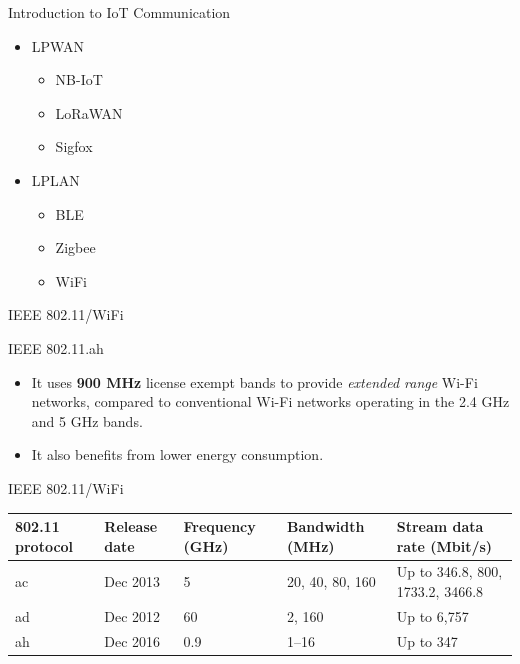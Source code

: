 \documentclass[serif,Blue]{beamer}
\begin{document}
\begin{frame}{Introduction to IoT Communication}
	\begin{itemize}
		\item LPWAN
			\begin{itemize}
				\item NB-IoT
				\item LoRaWAN
				\item Sigfox
			\end{itemize}
		\item LPLAN
			\begin{itemize}
				\item BLE
				\item Zigbee
				\item WiFi
			\end{itemize}
	\end{itemize}
\end{frame}

\begin{frame}{IEEE 802.11/WiFi}
	\begin{block}{IEEE 802.11.ah}
		\begin{itemize}
			\item It uses \textbf{900 MHz} license exempt bands to provide \emph{extended range} Wi-Fi networks, compared to conventional Wi-Fi networks operating in the 2.4 GHz and 5 GHz bands.
			\item It also benefits from lower energy consumption.
		\end{itemize}
	\end{block}
\end{frame}

\begin{frame}{IEEE 802.11/WiFi}
	\begin{tabular}{p{1cm} p{1cm} p{1.5cm} p{1.5cm} p{2cm}}
		\toprule
		802.11 protocol & Release date & Frequency (GHz) & Bandwidth (MHz) & Stream data rate (Mbit/s) \\
		\midrule
		ac & Dec 2013 & 5 & 20, 40, 80, 160 & Up to 346.8, 800, 1733.2, 3466.8\\
		ad & Dec 2012 & 60 & 2, 160 & Up to 6,757\\
		ah & Dec 2016 & 0.9 & 1--16 & Up to 347\\
		\bottomrule
	\end{tabular}
\end{frame}
\end{document}
